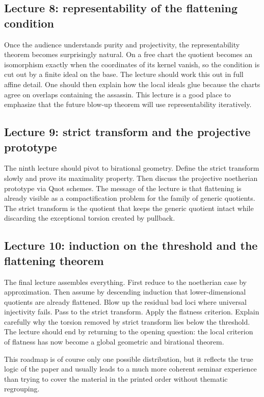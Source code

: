 \documentclass[11pt,oneside]{article}
\begin{document}
\subsection*{Lecture 8: representability of the flattening condition}

Once the audience understands purity and projectivity, the representability theorem becomes surprisingly natural.  On a free chart the quotient becomes an isomorphism exactly when the coordinates of its kernel vanish, so the condition is cut out by a finite ideal on the base.  The lecture should work this out in full affine detail.  One should then explain how the local ideals glue because the charts agree on overlaps containing the assassin.  This lecture is a good place to emphasize that the future blow-up theorem will use representability iteratively.

\subsection*{Lecture 9: strict transform and the projective prototype}

The ninth lecture should pivot to birational geometry.  Define the strict transform slowly and prove its maximality property.  Then discuss the projective noetherian prototype via Quot schemes.  The message of the lecture is that flattening is already visible as a compactification problem for the family of generic quotients.  The strict transform is the quotient that keeps the generic quotient intact while discarding the exceptional torsion created by pullback.

\subsection*{Lecture 10: induction on the threshold and the flattening theorem}

The final lecture assembles everything.  First reduce to the noetherian case by approximation.  Then assume by descending induction that lower-dimensional quotients are already flattened.  Blow up the residual bad loci where universal injectivity fails.  Pass to the strict transform.  Apply the flatness criterion.  Explain carefully why the torsion removed by strict transform lies below the threshold.  The lecture should end by returning to the opening question: the local criterion of flatness has now become a global geometric and birational theorem.

This roadmap is of course only one possible distribution, but it reflects the true logic of the paper and usually leads to a much more coherent seminar experience than trying to cover the material in the printed order without thematic regrouping.
\end{document}
